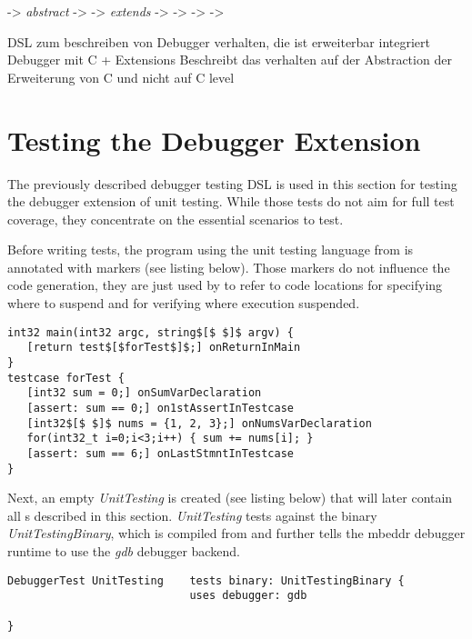 	-> \emph{abstract} -> 
	-> \emph{extends} ->  
	-> 
	-> 
	-> 

 



DSL zum beschreiben von Debugger verhalten, 
die ist erweiterbar integriert Debugger mit C + Extensions
Beschreibt das verhalten auf der Abstraction 
der Erweiterung von C und nicht auf C level 
	
\section{Testing the Debugger Extension}

The previously described debugger testing \ac{DSL} is used in this section for
testing the debugger extension of unit testing. While those
tests do not aim for full test coverage, they concentrate on the essential
scenarios to test.

Before writing tests, the program using the unit testing
language from  is annotated with markers
(see listing below). Those markers do not influence the code generation, they
are just used by  to refer to code locations for
specifying where to suspend and for verifying where
execution suspended.

\begin{lstlisting}[language=markerDSL]
int32 main(int32 argc, string$[$ $]$ argv) {
   [return test$[$forTest$]$;] onReturnInMain
}
testcase forTest {
   [int32 sum = 0;] onSumVarDeclaration
   [assert: sum == 0;] on1stAssertInTestcase
   [int32$[$ $]$ nums = {1, 2, 3};] onNumsVarDeclaration
   for(int32_t i=0;i<3;i++) { sum += nums[i]; }
   [assert: sum == 6;] onLastStmntInTestcase
}
\end{lstlisting}	

Next, an empty  \emph{UnitTesting} is created (see listing
below) that will later contain all s described in this
section. \emph{UnitTesting} tests against the binary
\emph{UnitTestingBinary}, which is compiled from  and further tells the
mbeddr debugger runtime to use the \emph{gdb} debugger backend.

\begin{lstlisting}[language=testingDSL]
DebuggerTest UnitTesting    tests binary: UnitTestingBinary {
                            uses debugger: gdb

}  
\end{lstlisting}

